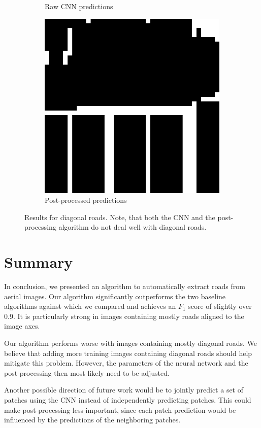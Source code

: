 \documentclass[10pt,conference,compsocconf]{IEEEtran}
\begin{document}
\begin{figure}
\begin{subfigure}[t]{.15\textwidth}
		\caption{Raw CNN predictions}
	\end{subfigure}
	\begin{subfigure}[t]{.15\textwidth}
		\includegraphics[width=1\textwidth]{figs/post_processing/postpro}
		\caption{Post-processed predictions}
	\end{subfigure}
	\caption{Results for diagonal roads. Note, that both the CNN and the post-processing algorithm do not deal well with diagonal roads.}
	\label{fig:post_processing}
\end{figure}

\section{Summary}
\label{sec:summary}
In conclusion, we presented an algorithm to automatically extract roads from aerial images. Our algorithm significantly outperforms the two baseline algorithms against which we compared and achieves an $ F_1 $ score of slightly over 0.9. It is particularly strong in images containing mostly roads aligned to the image axes.

\par 
Our algorithm performs worse with images containing mostly diagonal roads. We believe that adding more training images containing diagonal roads should help mitigate this problem. However, the parameters of the neural network and the post-processing then most likely need to be adjusted. 

\par 
Another possible direction of future work would be to jointly predict a set of patches using the CNN instead of independently predicting patches. This could make post-processing less important, since each patch prediction would be influenced by the predictions of the neighboring patches. 





\end{document}
